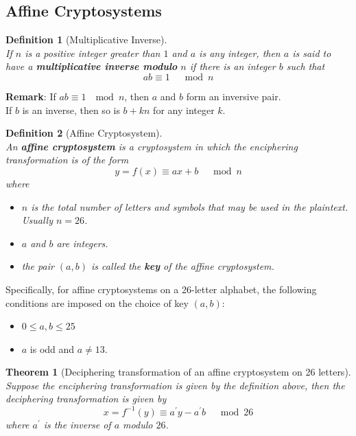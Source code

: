 \documentclass[12pt]{article}
\newtheorem{definition}{Definition}[section]
\newtheorem{theorem}{Theorem}[section]
\theoremstyle{definition}
\begin{document}
\subsection{Affine Cryptosystems}
\begin{definition}[Multiplicative Inverse]
\hfill\\\normalfont If $n$ is a positive integer greater than $1$ and $a$ is any integer, then $a$ is said to have a \textbf{multiplicative inverse modulo} $n$ if there is an integer $b$ such that
\[
ab\equiv 1\;\;\;\mod n
\]
\end{definition}
\textbf{Remark}: If $ab\equiv 1\;\mod n$, then $a$ and $b$ form an inversive pair.\\
If $b$ is an inverse, then so is $b+kn$ for any integer $k$.
\begin{definition}[Affine Cryptosystem]
\hfill\\\normalfont An \textbf{affine cryptosystem} is a cryptosystem in which the enciphering transformation is of the form
\[
y=f(x)\equiv ax+b\;\;\;\mod n
\]
where 
\begin{itemize}
  \item $n$ is the total number of letters and symbols that may be used in the plaintext. Usually $n=26$.
  \item $a$ and $b$ are integers.
  \item the pair $(a,b)$ is called the \textbf{key} of the affine cryptosystem.
\end{itemize}
\end{definition}
Specifically, for affine cryptosystems on  a 26-letter alphabet, the following conditions are imposed on the choice of key $(a,b)$:
\begin{itemize}
  \item $0\leq a,b\leq 25$
  \item $a$ is odd and $a\neq 13$.
\end{itemize}
\begin{theorem}[Deciphering transformation of an affine cryptosystem on 26 letters]
\hfill\\\normalfont Suppose the enciphering transformation is given by the definition above, then the deciphering transformation is given by
\[
x=f^{-1}(y)\equiv a^\prime y-a^\prime b\;\;\;\mod 26
\]
where $a^\prime$ is the inverse of $a$ modulo $26$.
\end{theorem}
\end{document}
